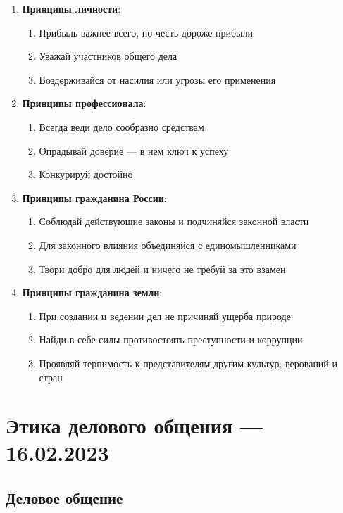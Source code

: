 \documentclass{article}
\begin{document}
\begin{enumerate}
    \item \textbf{Принципы личности}:
    \begin{enumerate}
        \item Прибыль важнее всего, но честь дороже прибыли
        \item Уважай участников общего дела
        \item Воздерживайся от насилия или угрозы его применения
    \end{enumerate}
    \item \textbf{Принципы профессионала}:
    \begin{enumerate}
        \item Всегда веди дело сообразно средствам
        \item Опрадывай доверие — в нем ключ к успеху
        \item Конкурируй достойно
    \end{enumerate}
    \item \textbf{Принципы гражданина России}:
    \begin{enumerate}
        \item Соблюдай действующие законы и подчиняйся законной власти
        \item Для законного влияния объединяйся с единомышленниками
        \item Твори добро для людей и ничего не требуй за это взамен
    \end{enumerate}
    \item \textbf{Принципы гражданина земли}:
    \begin{enumerate}
        \item При создании и ведении дел не причиняй ущерба природе
        \item Найди в себе силы противостоять преступности и коррупции
        \item Проявляй терпимость к представителям другим культур, верований и стран
    \end{enumerate}
\end{enumerate}

\pagebreak
\section{Этика делового общения — 16.02.2023}

\subsection{Деловое общение}
\end{document}

